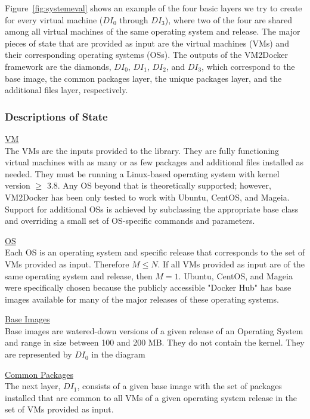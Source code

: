 Figure~\ref{fig:systemeval} shows an example of the four basic layers we try to create for every virtual machine ($DI_0$ through $DI_3$), where two of the four are shared among all virtual machines of the same operating system and release. The major pieces of state that are provided as input are the virtual machines (VMs) and their corresponding operating systems (OSs). The outputs of the VM2Docker framework are the diamonds, $DI_0$, $DI_1$, $DI_2$, and $DI_3$, which correspond to the base image, the common packages layer, the unique packages layer, and the additional files layer, respectively.

\subsubsection{Descriptions of State}

\underline{VM}\\
The VMs are the inputs provided to the library. They are fully functioning virtual machines with as many or as few packages and additional files installed as needed. They must be running a Linux-based operating system with kernel version $\ge$ 3.8. Any OS beyond that is theoretically supported; however, VM2Docker has been only tested to work with Ubuntu, CentOS, and Mageia. Support for additional OSs is achieved by subclassing the appropriate base class and overriding a small set of OS-specific commands and parameters.

\underline{OS}\\
Each OS is an operating system and specific release that corresponds to the set of VMs provided as input. Therefore $M \le N$. If all VMs provided as input are of the same operating system and release, then $M=1$. Ubuntu, CentOS, and Mageia were specifically chosen because the publicly accessible "Docker Hub" has base images available for many of the major releases of these operating systems.

\underline{Base Images}\\
Base images are watered-down versions of a given release of an Operating System and range in size between 100 and 200 MB. They do not contain the kernel. They are represented by $DI_0$ in the diagram

\underline{Common Packages}\\
The next layer, $DI_1$, consists of a given base image with the set of packages installed that are common to all VMs of a given operating system release in the set of VMs provided as input.


